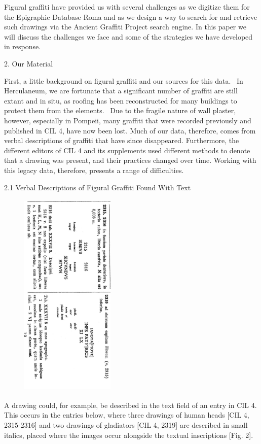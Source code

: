\documentclass[amsthm,ebook]{saparticle}
\begin{document}
\bigskip

Figural graffiti have provided us with several challenges as we digitize them for the Epigraphic Database Roma and as we
design a way to search for and retrieve such drawings via the Ancient Graffiti Project search engine. In this paper we
will discuss the challenges we face and some of the strategies we have developed in response. \ 


\bigskip

2. Our Material 

First, a little background on figural graffiti and our sources for this data. \ In Herculaneum, we are fortunate that a
significant number of graffiti are still extant and in situ, as roofing has been reconstructed for many buildings to
protect them from the elements. \ Due to the fragile nature of wall plaster, however, especially in Pompeii, many
graffiti that were recorded previously and published in CIL 4, have now been lost. Much of our data, therefore, comes
from verbal descriptions of graffiti that have since disappeared. Furthermore, the different editors of CIL 4 and its
supplements used different methods to denote that a drawing was present, and their practices changed over time. Working
with this legacy data, therefore, presents a range of difficulties. \ 


\bigskip

2.1 Verbal Descriptions of Figural Graffiti Found With Text

\begin{figure}
\centering
\includegraphics[width=4.493cm,height=9.979cm]{EAGLE2016BenefielSypniewski-img002.jpg}
\end{figure}
A drawing could, for example, be described in the text field of an entry in CIL 4. This occurs in the entries below,
where three drawings of human heads [CIL 4, 2315-2316] and two drawings of gladiators [CIL 4, 2319] are described in
small italics, placed where the images occur alongside the textual inscriptions [Fig. 2]. 
\end{document}
